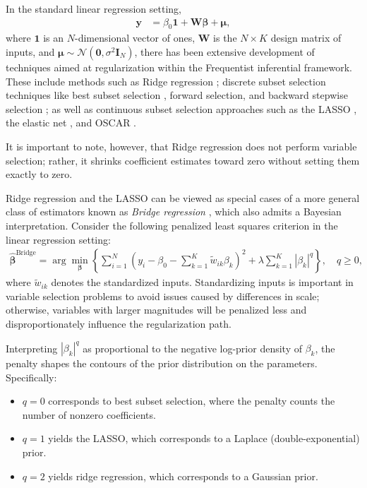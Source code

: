 In the standard linear regression setting,
\begin{align*}
	\mathbf{y} &= \beta_0\mathbf{1} + \mathbf{W}\boldsymbol{\beta} + \boldsymbol{\mu},
\end{align*}
where \(\mathbf{1}\) is an \(N\)-dimensional vector of ones, \(\mathbf{W}\) is the \(N \times K\) design matrix of inputs, and \(\boldsymbol{\mu} \sim \mathcal{N}(\mathbf{0}, \sigma^2 \mathbf{I}_N)\), there has been extensive development of techniques aimed at regularization within the Frequentist inferential framework. These include methods such as Ridge regression \cite{hoerl1970ridge}; discrete subset selection techniques like best subset selection \cite{furnival1974regressions}, forward selection, and backward stepwise selection \cite{hastie2009elements}; as well as continuous subset selection approaches such as the LASSO \cite{tibshirani1996regression}, the elastic net \cite{zou2005regularization}, and OSCAR \cite{bondell2008simultaneous}.

It is important to note, however, that Ridge regression does not perform variable selection; rather, it shrinks coefficient estimates toward zero without setting them exactly to zero.

Ridge regression and the LASSO can be viewed as special cases of a more general class of estimators known as \textit{Bridge regression} \cite{fu1998penalized}, which also admits a Bayesian interpretation. Consider the following penalized least squares criterion in the linear regression setting:
\begin{align*}
	\hat{\boldsymbol{\beta}}^{\text{Bridge}} = \arg\min_{\boldsymbol{\beta}} \left\{ \sum_{i=1}^N \left( y_i - \beta_0 - \sum_{k=1}^K \tilde{w}_{ik} \beta_k \right)^2 + \lambda \sum_{k=1}^K |\beta_k|^q \right\}, \quad q \geq 0,
\end{align*}
where \(\tilde{w}_{ik}\) denotes the standardized inputs. Standardizing inputs is important in variable selection problems to avoid issues caused by differences in scale; otherwise, variables with larger magnitudes will be penalized less and disproportionately influence the regularization path.

Interpreting \( |\beta_k|^q \) as proportional to the negative log-prior density of \( \beta_k \), the penalty shapes the contours of the prior distribution on the parameters. Specifically:
\begin{itemize}
	\item \( q = 0 \) corresponds to best subset selection, where the penalty counts the number of nonzero coefficients.
	\item \( q = 1 \) yields the LASSO, which corresponds to a Laplace (double-exponential) prior.
	\item \( q = 2 \) yields ridge regression, which corresponds to a Gaussian prior.  
	 
\end{itemize}

